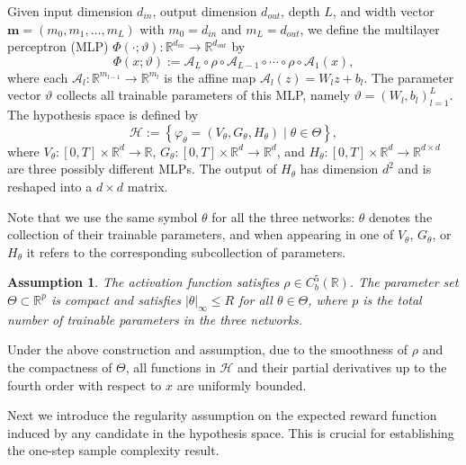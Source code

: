 \documentclass[twoside,11pt]{article}
\newtheorem{assumption}{Assumption}
\newcommand{\1}{\mathbf{1}}
\numberwithin{equation}{section}
\begin{document}
\begin{definition}
\label{def: hypothesis space}
Given input dimension $d_{in}$, output dimension $d_{out}$, depth $L$, and width vector $\mathbf m=(m_0,m_1,\ldots,m_L)$ with $m_0=d_{in}$ and $m_L=d_{out}$, we define the multilayer perceptron (MLP) $\Phi(\cdot;\vartheta):\mathbb R^{d_{in}}\to\mathbb R^{d_{out}}$ by
\begin{equation}
\Phi(x;\vartheta)
:=
\mathcal A_L\circ \rho\circ \mathcal A_{L-1}\circ \cdots \circ \rho\circ \mathcal A_1(x),
\end{equation}
where each $\mathcal A_l:\mathbb R^{m_{l-1}}\to\mathbb R^{m_l}$ is the affine map $\mathcal A_l(z)=W_lz+b_l$. The parameter vector $\vartheta$ collects all trainable parameters of this MLP, namely $\vartheta={(W_l,b_l)}_{l=1}^L$.
The hypothesis space is defined by
\begin{equation}
\mathcal H
:=
\left\{
\varphi_{\theta}
=
(V_{\theta},G_{\theta},H_{\theta})
\mid
\theta\in\Theta
\right\},
\end{equation}
where $V_{\theta}:[0,T]\times\mathbb R^d\to\mathbb R$, $G_{\theta}:[0,T]\times\mathbb R^d\to\mathbb R^d$, and $H_{\theta}:[0,T]\times\mathbb R^d\to\mathbb R^{d\times d}$ are three possibly different MLPs. The output of $H_{\theta}$ has dimension $d^2$ and is reshaped into a $d\times d$ matrix.
\end{definition}

Note that we use the same symbol $\theta$ for all the three networks: $\theta$ denotes the collection of their trainable parameters, and when appearing in one of $V_\theta$, $G_\theta$, or $H_\theta$ it refers to the corresponding subcollection of parameters.

\begin{assumption}
\label{assum: hypothesis space}
The activation function satisfies $\rho\in C_b^5(\mathbb R)$.  The parameter set $\Theta\subset\mathbb R^p$ is compact and satisfies $|\theta|_\infty\le R$ for all $\theta\in\Theta$, where $p$ is the total number of trainable parameters in the three networks.
\end{assumption}


Under the above construction and assumption, due to the smoothness of $\rho$ and the compactness of $\Theta$, all functions in $\mathcal{H}$ and their partial derivatives up to the fourth order with respect to $x$ are uniformly bounded.

Next we introduce the regularity assumption on the expected reward function induced by any candidate in the hypothesis space. This is crucial for establishing the one-step sample complexity result.
\end{document}
